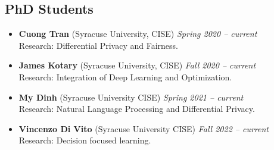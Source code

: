\subsection*{PhD Students}
\begin{itemize}
    \item \textbf{Cuong Tran} ({\sc Syracuse University}, CISE) 
  \hfill{\em Spring 2020 -- current}\\
  {\sc Research}: Differential Privacy and Fairness.

  \item \textbf{James Kotary} ({\sc Syracuse University}, CISE) 
  \hfill{\em Fall 2020 -- current}\\
  {\sc Research}: Integration of Deep Learning and Optimization.
  
  \item \textbf{My Dinh} ({\sc Syracuse University} CISE) 
  \hfill{\em Spring 2021 -- current}\\
  {\sc Research}: Natural Language Processing and Differential Privacy.

  \item \textbf{Vincenzo Di Vito} ({\sc Syracuse University} CISE)
  \hfill{\em Fall 2022 -- current}\\
  {\sc Research:} Decision focused learning.


\end{itemize}
\medskip

